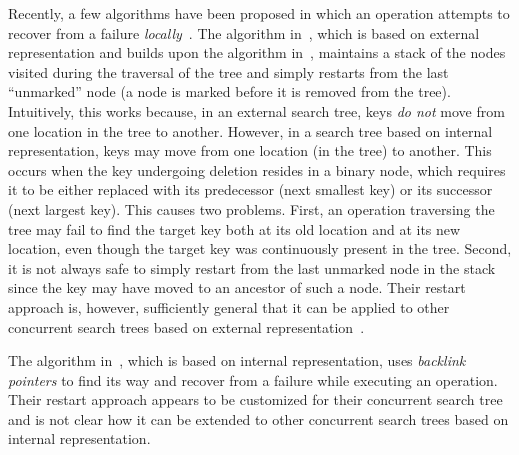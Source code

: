 Recently, a few algorithms have been proposed in which an operation attempts to recover from a failure \emph{locally}~\cite{EllFat+:2014:PODC,ChaDan+:2014:PODC}. The algorithm in~\cite{EllFat+:2014:PODC}, which is based on external representation and builds upon the algorithm in~\cite{EllFat+:2010:PODC}, maintains a stack of the nodes visited during the traversal of the tree and simply restarts from the last ``unmarked'' node  (a node is marked before it is removed from the tree). Intuitively, this works because, in an external search tree, keys \emph{do not} move from one location in the tree to another. However, in a search tree based on internal representation, keys may move from one location (in the tree) to another. This occurs when the key undergoing deletion resides in a binary node, which requires it to be either replaced with its predecessor (next smallest key) or its successor (next largest key). This causes two problems. First, an operation traversing the tree may fail to find the target key both at its old location and at its new location, even though the target key was continuously present in the tree. Second, it is not always safe to simply restart from the last unmarked node in the stack since the key may have moved to an ancestor of such a node. Their restart approach is, however, sufficiently general that it can be applied to other concurrent search trees based on external representation~\cite{NatMit:2014:PPoPP}.

The algorithm in~\cite{ChaDan+:2014:PODC},  which is based on internal representation, uses \emph{backlink pointers} to find its way and recover from a failure while executing an operation. Their restart approach appears to be customized for their concurrent search tree and is not clear how it can be extended to other concurrent search trees based on internal representation.

